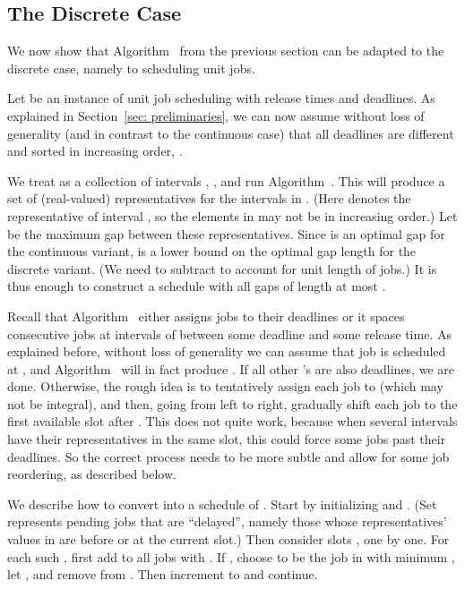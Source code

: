 \subsection{The Discrete Case}

We now show that Algorithm~ from the previous section can be adapted
to the discrete case, namely to scheduling unit jobs.

Let  be an instance of unit job scheduling with release times and deadlines.   
As explained in Section~\ref{sec: preliminaries},  we can now assume 
without loss of generality (and in contrast to the continuous case) that
all deadlines are different and sorted in increasing order, .

We treat  as a collection of intervals , , and
run Algorithm~. This will produce a set of
(real-valued) representatives  for the intervals in . 
(Here  denotes the representative of interval , so the elements in  may not be in increasing order.)
Let  be the maximum gap between these representatives. Since 
is an optimal gap for the continuous variant, 
is a lower bound on the optimal gap length for the discrete variant.
(We need to subtract  to account for unit length of jobs.)
It is thus enough to construct a schedule with all gaps of length at most .

Recall that Algorithm~ either assigns jobs to their deadlines
or it spaces consecutive jobs at intervals of  between some deadline and some release time.
As explained before, without loss of generality we can assume that job  is scheduled at , and
Algorithm~ will in fact produce . 
If all other 's are also deadlines, we are done. Otherwise, the rough idea is
to tentatively assign each job  to  (which may not be integral), and then, going from left to right,
gradually shift each job to the first available slot after . This does not quite
work, because when several intervals have their representatives in the same slot, this
could force some jobs past their deadlines. So the correct process needs to be more
subtle and allow for some job reordering, as described below.



\medskip
{}
We describe how to convert  into a schedule  of . Start by initializing  and . 
(Set  represents pending jobs that are ``delayed'', namely those
whose representatives' values in  are before or at the current slot.)
Then consider slots , one by one. For each such , first add to  all jobs  with . 
If , choose  to be the job in  with minimum , let , and remove  from .
Then increment  to  and continue.
\smallskip




